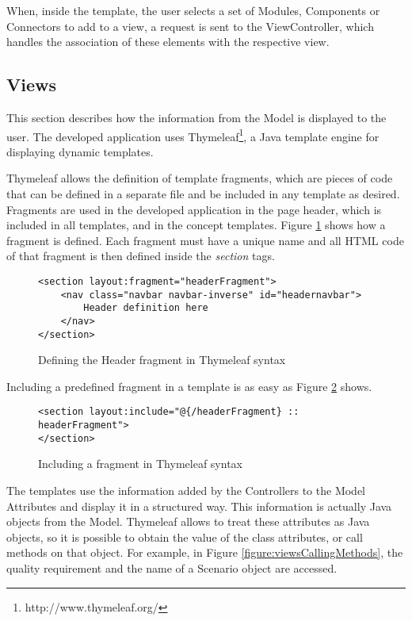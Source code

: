 \documentclass[conference]{IEEEtran}
\begin{document}
When, inside the template, the user selects a set of Modules, Components or Connectors to add to a view, a request is sent to the ViewController, which handles the association of these elements with the respective view.

\subsection{Views}
\label{section:Views}
This section describes how the information from the Model is displayed to the user. The developed application uses Thymeleaf\footnote{http://www.thymeleaf.org/}, a Java template engine for displaying dynamic templates.

Thymeleaf allows the definition of template fragments, which are pieces of code that can be defined in a separate file and be included in any template as desired. Fragments are used in the developed application in the page header, which is included in all templates, and in the concept templates. Figure \ref{figure:viewsHeaderFragment} shows how a fragment is defined. Each fragment must have a unique name and all HTML code of that fragment is then defined inside the \textit{section} tags.
\begin{figure}
\lstset{style=customhtml}
\begin{lstlisting}
<section layout:fragment="headerFragment">
	<nav class="navbar navbar-inverse" id="headernavbar">
		Header definition here	
	</nav>
</section>
\end{lstlisting}
\caption{Defining the Header fragment in Thymeleaf syntax}
\label{figure:viewsHeaderFragment}
\end{figure}

Including a predefined fragment in a template is as easy as Figure \ref{figure:viewsIncludeFragment} shows.
\begin{figure}
\lstset{style=customhtml}
\begin{lstlisting}
<section layout:include="@{/headerFragment} :: headerFragment">
</section>
\end{lstlisting}
\caption{Including a fragment in Thymeleaf syntax}
\label{figure:viewsIncludeFragment}
\end{figure}

The templates use the information added by the Controllers to the Model Attributes and display it in a structured way. This information is actually Java objects from the Model. Thymeleaf allows to treat these attributes as Java objects, so it is possible to obtain the value of the class attributes, or call methods on that object. For example, in Figure \ref{figure:viewsCallingMethods}, the quality requirement and the name of a Scenario object are accessed.
\end{document}
